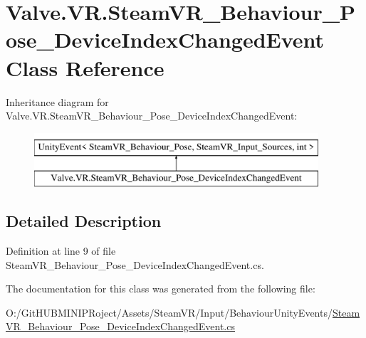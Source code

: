 \hypertarget{class_valve_1_1_v_r_1_1_steam_v_r___behaviour___pose___device_index_changed_event}{}\section{Valve.\+V\+R.\+Steam\+V\+R\+\_\+\+Behaviour\+\_\+\+Pose\+\_\+\+Device\+Index\+Changed\+Event Class Reference}
\label{class_valve_1_1_v_r_1_1_steam_v_r___behaviour___pose___device_index_changed_event}
Inheritance diagram for Valve.\+V\+R.\+Steam\+V\+R\+\_\+\+Behaviour\+\_\+\+Pose\+\_\+\+Device\+Index\+Changed\+Event\+:\begin{figure}[H]
\begin{center}
\leavevmode
\includegraphics[height=2.000000cm]{class_valve_1_1_v_r_1_1_steam_v_r___behaviour___pose___device_index_changed_event}
\end{center}
\end{figure}


\subsection{Detailed Description}


Definition at line 9 of file Steam\+V\+R\+\_\+\+Behaviour\+\_\+\+Pose\+\_\+\+Device\+Index\+Changed\+Event.\+cs.



The documentation for this class was generated from the following file\+:\begin{DoxyCompactItemize}
\item 
O\+:/\+Git\+H\+U\+B\+M\+I\+N\+I\+P\+Roject/\+Assets/\+Steam\+V\+R/\+Input/\+Behaviour\+Unity\+Events/\mbox{\hyperlink{_steam_v_r___behaviour___pose___device_index_changed_event_8cs}{Steam\+V\+R\+\_\+\+Behaviour\+\_\+\+Pose\+\_\+\+Device\+Index\+Changed\+Event.\+cs}}\end{DoxyCompactItemize}

